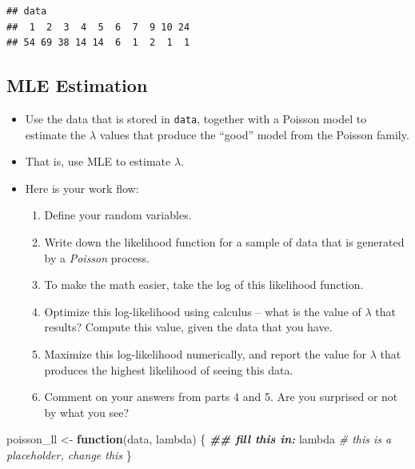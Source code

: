 \documentclass[
]{book}
\newenvironment{Shaded}{\begin{snugshade}}{\end{snugshade}}
\newcommand{\CommentTok}[1]{\textcolor[rgb]{0.56,0.35,0.01}{\textit{#1}}}
\newcommand{\ControlFlowTok}[1]{\textcolor[rgb]{0.13,0.29,0.53}{\textbf{#1}}}
\newcommand{\DocumentationTok}[1]{\textcolor[rgb]{0.56,0.35,0.01}{\textbf{\textit{#1}}}}
\newcommand{\NormalTok}[1]{#1}
\newcommand{\OtherTok}[1]{\textcolor[rgb]{0.56,0.35,0.01}{#1}}
\providecommand{\tightlist}{%
  \setlength{\itemsep}{0pt}\setlength{\parskip}{0pt}}
\theoremstyle{definition}
\theoremstyle{definition}
\theoremstyle{definition}
\theoremstyle{definition}
\theoremstyle{remark}
\begin{document}
\begin{verbatim}
## data
##  1  2  3  4  5  6  7  9 10 24 
## 54 69 38 14 14  6  1  2  1  1
\end{verbatim}

\subsection{MLE Estimation}\label{mle-estimation}

\begin{itemize}
\item
  Use the data that is stored in \texttt{data}, together with a Poisson model to estimate the \(\lambda\) values that produce the ``good'' model from the Poisson family.
\item
  That is, use MLE to estimate \(\lambda\).
\item
  Here is your work flow:

  \begin{enumerate}
  \def\labelenumi{\arabic{enumi}.}
  \tightlist
  \item
    Define your random variables.
  \item
    Write down the likelihood function for a sample of data that is generated by a \emph{Poisson} process.
  \item
    To make the math easier, take the log of this likelihood function.
  \item
    Optimize this log-likelihood using calculus -- what is the value of \(\lambda\) that results? Compute this value, given the data that you have.
  \item
    Maximize this log-likelihood numerically, and report the value for \(\lambda\) that produces the highest likelihood of seeing this data.
  \item
    Comment on your answers from parts 4 and 5. Are you surprised or not by what you see?
  \end{enumerate}
\end{itemize}

\begin{Shaded}
\begin{Highlighting}[]
\NormalTok{poisson\_ll }\OtherTok{\textless{}{-}} \ControlFlowTok{function}\NormalTok{(data, lambda) \{ }
  \DocumentationTok{\#\# fill this in:  }
\NormalTok{  lambda }\CommentTok{\# this is a placeholder, change this}
\NormalTok{\}}
\end{Highlighting}
\end{Shaded}
\end{document}
